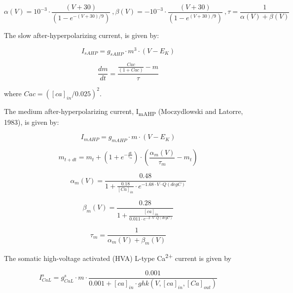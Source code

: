 \documentclass[a4paper]{article}
\begin{document}
\begin{equation}
α(V) = 10^{-3}\cdot \frac{(V+30)}{(1-e^{-(V+30)/9})} \ ,         β(V) = -10^{-3}\cdot \frac{(V+30)}{(1-e^{(V+30)/9})} \ , 
τ=\frac 1{α(V)+β(V)}
\end{equation}


The slow after-hyperpolarizing current, is given by:


\begin{equation}
I_{sAHP}= g_{sAHP}\cdot m^3\cdot
(V-E_K)
\end{equation}

\begin{equation}
\frac{dm}{dt}=\frac{\frac{Cac}{(1+Cac)}-m}{τ}
\end{equation}


where 
$Cac=([ca]_{in}/0.025)^2$.



The medium after-hyperpolarizing current, I\textsubscript{mAHP} (Moczydlowski and Latorre, 1983), is given by:


\begin{equation}
I_{mAHP}= g_{mAHP}\cdot m\cdot
(V-E_K)
\end{equation}

\begin{equation}
m_{t+dt}=m_t+(1+e^{-\frac{dt}{τ_m}})\cdot (\frac{α_m(V)}{τ_m}-m_t)
\end{equation}

\begin{equation}
α_m(V)=\frac{0.48}{1+\frac{0.18}{[Ca]_{in}}\cdot
e^{-1.68\cdot V\cdot Q(degC)}}
\end{equation}

\begin{equation}
β_m(V)=\frac{0.28}{1+\frac{[ca]_{in}}{0.011\cdot
e^{-2\cdot V\cdot Q(degC)}}}
\end{equation}

\begin{equation}
τ_m=\frac {1}{α_m(V)+β_m(V)}
\end{equation}

The somatic high-voltage activated (HVA) L-type Ca\textsuperscript{2+} current is given by


\begin{equation}
I_{CaL}^s= g_{CaL}^s\cdot m\cdot
\frac{0.001 }{0.001 + [ca]_{in}\cdot
ghk(V, [ca]_{in}, [Ca]_{out})}
\end{equation}
\end{document}
